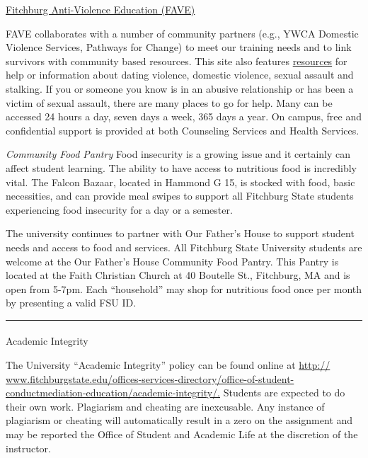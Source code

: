 \documentclass[
  letterpaper,
  DIV=11,
  numbers=noendperiod,
  oneside]{scrartcl}
\makeatletter
\let\oldparagraph\paragraph
\renewcommand{\paragraph}{
    \@ifstar
      \xxxParagraphStar
      \xxxParagraphNoStar
  }
\newcommand{\xxxParagraphStar}[1]{\oldparagraph*{#1}\mbox{}}
\newcommand{\xxxParagraphNoStar}[1]{\oldparagraph{#1}\mbox{}}
\makeatother
\begin{document}
\href{http://www.google.com/url?q=http\%3A\%2F\%2Fwww.fitchburgstate.edu\%2Foffices-services-directory\%2Ffitchburg-anti-violence-education\%2F&sa=D&sntz=1&usg=AFQjCNFi5qy-wunMxX-hoWbA9YwT8aa4Ig}{Fitchburg
Anti-Violence Education (FAVE)}

FAVE collaborates with a number of community partners (e.g., YWCA
Domestic Violence Services, Pathways for Change) to meet our training
needs and to link survivors with community based resources. This site
also features
\href{http://www.google.com/url?q=http\%3A\%2F\%2Fwww.fitchburgstate.edu\%2Foffices-services-directory\%2Ffitchburg-anti-violence-education\%2Ffitchburg-anti-violence-education-resources\%2F&sa=D&sntz=1&usg=AFQjCNF9KZ2O1AvPMLJTHdNg1DfmYYtgog}{resources}
for help or information about dating violence, domestic violence, sexual
assault and stalking. If you or someone you know is in an abusive
relationship or has been a victim of sexual assault, there are many
places to go for help. Many can be accessed 24 hours a day, seven days a
week, 365 days a year. On campus, free and confidential support is
provided at both Counseling Services and Health Services.

\emph{Community Food Pantry} Food insecurity is a growing issue and it
certainly can affect student learning. The ability to have access to
nutritious food is incredibly vital. The Falcon Bazaar, located in
Hammond G 15, is stocked with food, basic necessities, and can provide
meal swipes to support all Fitchburg State students experiencing food
insecurity for a day or a semester.

The university continues to partner with Our Father's House to support
student needs and access to food and services. All Fitchburg State
University students are welcome at the Our Father's House Community Food
Pantry. This Pantry is located at the Faith Christian Church at 40
Boutelle St., Fitchburg, MA and is open from 5-7pm. Each ``household''
may shop for nutritious food once per month by presenting a valid FSU
ID.

\begin{center}\rule{0.5\linewidth}{0.5pt}\end{center}

\paragraph{Academic Integrity}\label{academic-integrity}

The University ``Academic Integrity'' policy can be found online at
\href{http://www.fitchburgstate.edu/offices-services-directory/office-of-student-conduct-mediation-education/academic-integrity/}{http://
www.fitchburgstate.edu/offices-services-directory/office-of-student-conductmediation-education/academic-integrity/.}
Students are expected to do their own work. Plagiarism and cheating are
inexcusable. Any instance of plagiarism or cheating will automatically
result in a zero on the assignment and may be reported the Office of
Student and Academic Life at the discretion of the instructor.
\end{document}
